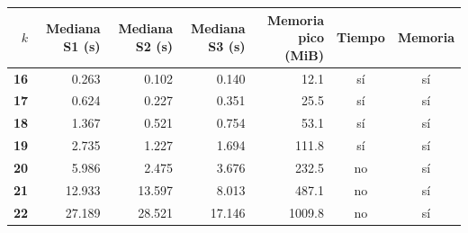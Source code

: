 \renewcommand{\arraystretch}{1.2}
\begin{tabular}{|r|r|r|r|r|c|c|}
\hline
\rowcolor{gray!20} \textbf{$k$} & \textbf{Mediana S1 (s)} & \textbf{Mediana S2 (s)} & \textbf{Mediana S3 (s)} & \textbf{Memoria pico (MiB)} & \textbf{Tiempo} & \textbf{Memoria} \\
\hline
\textbf{16} & 0.263 & 0.102 & 0.140 & 12.1 & sí & sí \\
\hline
\textbf{17} & 0.624 & 0.227 & 0.351 & 25.5 & sí & sí \\
\hline
\textbf{18} & 1.367 & 0.521 & 0.754 & 53.1 & sí & sí \\
\hline
\textbf{19} & 2.735 & 1.227 & 1.694 & 111.8 & sí & sí \\
\hline
\textbf{20} & 5.986 & 2.475 & 3.676 & 232.5 & no & sí \\
\hline
\textbf{21} & 12.933 & 13.597 & 8.013 & 487.1 & no & sí \\
\hline
\textbf{22} & 27.189 & 28.521 & 17.146 & 1009.8 & no & sí \\
\hline
\end{tabular}
